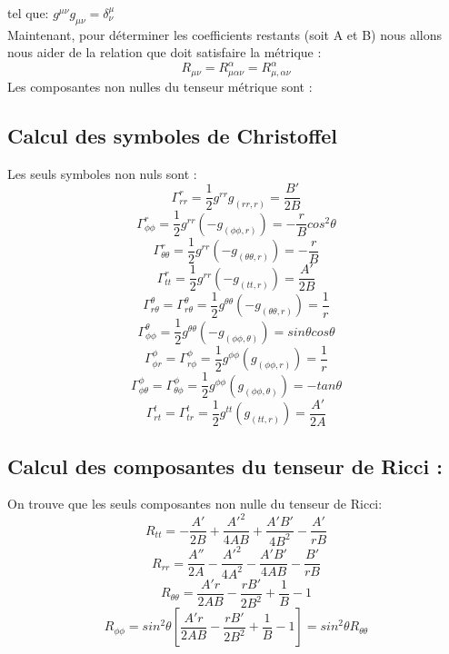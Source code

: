 \documentclass[12pt,  a4paper, openright]{report} %
\begin{document}
tel que: $g^{\mu\nu}g_{\mu\nu}=\delta_{\nu}^{\mu}$\\
Maintenant, pour déterminer les coefficients restants (soit A et B) nous allons nous aider de la relation que doit satisfaire la métrique :\\

$$R_{\mu\nu}=R_{\mu\alpha\nu}^{\alpha}=R_{\mu,\alpha\nu}^{\alpha}$$
Les composantes non nulles du tenseur métrique sont :\\
\subsection*{Calcul des symboles de Christoffel}
Les seuls symboles non nuls sont :\\
$$\Gamma_{rr}^{r}=\dfrac{1}{2}g^{rr}g_{(rr,r)}=\dfrac{B'}{2B}$$
$$\Gamma_{\phi\phi}^{r}=\dfrac{1}{2}g^{rr}(-g_{(\phi\phi,r)})=-\dfrac{r}{B}cos^{2}\theta$$
$$\Gamma_{\theta\theta}^{r}=\dfrac{1}{2}g^{rr}(-g_{(\theta\theta,r)})=-\dfrac{r}{B}$$
$$\Gamma_{tt}^{r}=\dfrac{1}{2}g^{rr}(-g_{(tt,r)})=\dfrac{A'}{2B}$$
$$\Gamma_{r\theta}^{\theta}=\Gamma_{r\theta}^{\theta}=\dfrac{1}{2}g^{\theta\theta}(-g_{(\theta\theta,r)})=\dfrac{1}{r}$$
$$\Gamma_{\phi\phi}^{\theta}=\dfrac{1}{2}g^{\theta\theta}(-g_{(\phi\phi,\theta)})=sin\theta cos\theta$$
$$\Gamma_{\phi r}^{\phi}=\Gamma_{r\phi}^{\phi}=\dfrac{1}{2}g^{\phi\phi}(g_{(\phi\phi,r)})=\dfrac{1}{r}$$
$$\Gamma_{\phi\theta}^{\phi}=\Gamma_{\theta\phi}^{\phi}=\dfrac{1}{2}g^{\phi\phi}(g_{(\phi\phi,\theta)})=-tan\theta$$
$$\Gamma_{rt}^{t}=\Gamma_{tr}^{t}=\dfrac{1}{2}g^{tt}(g_{(tt,r)})=\dfrac{A'}{2A}$$
\subsection*{Calcul des composantes du tenseur de Ricci :}
On trouve que les seuls composantes non nulle du tenseur de Ricci:
\begin{equation}
R_{tt}=-\dfrac{A'}{2B}+\dfrac{A'^{2}}{4AB}+\dfrac{A'B'}{4B^{2}}-\dfrac{A'}{rB}
\end{equation}
\begin{equation}
R_{rr}=\dfrac{A''}{2A}-\dfrac{A'^{2}}{4A^{2}}-\dfrac{A'B'}{4AB}-\dfrac{B'}{rB}
\end{equation}
\begin{equation}
R_{\theta\theta}=\dfrac{A'r}{2AB}-\dfrac{rB'}{2B^{2}}+\dfrac{1}{B}-1
\end{equation}
\begin{equation}
R_{\phi\phi}=sin^{2}\theta \left[\dfrac{A'r}{2AB}-\dfrac{rB'}{2B^{2}}+\dfrac{1}{B}-1 \right]=sin^{2}\theta R_{\theta\theta}
\end{equation}
\end{document}
